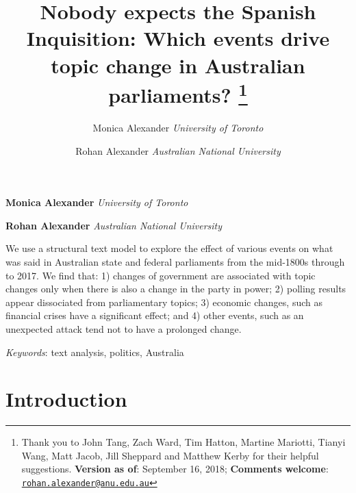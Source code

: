 \documentclass[12pt,]{article}
\title{Nobody expects the Spanish Inquisition: Which events drive topic change
in Australian parliaments? \thanks{Thank you to John Tang, Zach Ward, Tim Hatton, Martine Mariotti, Tianyi
Wang, Matt Jacob, Jill Sheppard and Matthew Kerby for their helpful
suggestions. \textbf{Version as of}: September 16, 2018;
\textbf{Comments welcome}:
\href{mailto:rohan.alexander@anu.edu.au}{\nolinkurl{rohan.alexander@anu.edu.au}}}  }
\author{\Large Monica Alexander\vspace{0.05in} \newline\normalsize\emph{University of Toronto}   \and \Large Rohan Alexander\vspace{0.05in} \newline\normalsize\emph{Australian National University}  }
\date{}
\newcommand*{\authorfont}{\fontfamily{phv}\selectfont}
\renewenvironment{abstract}
 {{%
    \setlength{\leftmargin}{0mm}
    \setlength{\rightmargin}{\leftmargin}%
  }%
  \relax}
 {\endlist}
\begin{document}
	
%

{%
\setlength{\parindent}{0pt}
\thispagestyle{plain}
{\fontsize{18}{20}\selectfont\raggedright 
\maketitle  %

}

{
   \vskip 13.5pt\relax \normalsize\fontsize{11}{12} 
\textbf{\authorfont Monica Alexander} \hskip 15pt \emph{\small University of Toronto}   \par \textbf{\authorfont Rohan Alexander} \hskip 15pt \emph{\small Australian National University}   

}

}








\begin{abstract}

    \hbox{\vrule height .2pt width 39.14pc}

    \vskip 8.5pt %

\noindent We use a structural text model to explore the effect of various events
on what was said in Australian state and federal parliaments from the
mid-1800s through to 2017. We find that: 1) changes of government are
associated with topic changes only when there is also a change in the
party in power; 2) polling results appear dissociated from parliamentary
topics; 3) economic changes, such as financial crises have a significant
effect; and 4) other events, such as an unexpected attack tend not to
have a prolonged change.


\vskip 8.5pt \noindent \emph{Keywords}: text analysis, politics, Australia \par

    \hbox{\vrule height .2pt width 39.14pc}



\end{abstract}


\vskip 6.5pt


\noindent  \section{Introduction}\label{introduction}
\end{document}
